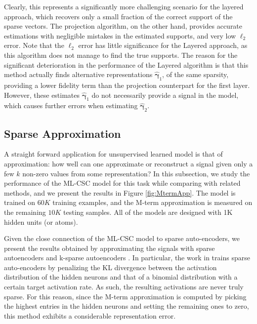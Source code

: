 \documentclass[10pt,journal]{IEEEtran}
\def\D{{\mathbf D}}
\def\gama{{\boldsymbol \gamma}}
\theoremstyle{plain}
\theoremstyle{definition}
\begin{document}
Clearly, this represents a significantly more challenging scenario for the layered approach, which recovers only a small fraction of the correct support of the sparse vectors. The projection algorithm, on the other hand, provides accurate estimations with negligible mistakes in the estimated supports, and very low $\ell_2$ error. Note that the $\ell_2$ error has little significance for the Layered approach, as this algorithm does not manage to find the true supports.
The reason for the significant deterioration in the performance of the Layered algorithm is that this method actually finds alternative representations $\hat{\gama}_1$, of the same sparsity, providing a lower fidelity term than the projection counterpart for the first layer. However, these estimates $\hat{\gama}_1$ do not necessarily provide a signal in the model, which causes further errors when estimating $\hat{\gama}_2$. 

\subsection{Sparse Approximation}

A straight forward application for unsupervised learned model is that of approximation: how well can one approximate or reconstruct a signal given only a few $k$ non-zero values from some representation? In this subsection, we study the performance of the ML-CSC model for this task while comparing with related methods, and we present the results in Figure \ref{fig:MtermApp}. The model is trained on $60K$ training examples, and the M-term approximation is measured on the remaining $10K$ testing samples. All of the models are designed with 1K hidden units (or atoms).

Given the close connection of the ML-CSC model to sparse auto-encoders, we present the results obtained by approximating the signals with sparse autoencoders \cite{ng2011sparse} and k-sparse autoencoders \cite{makhzani2013k}. In particular, the work in \cite{ng2011sparse} trains sparse auto-encoders by penalizing the KL divergence between the activation distribution of the hidden neurons and that of a binomial distribution with a certain target activation rate. As such, the resulting activations are never truly sparse. For this reason, since the M-term approximation is computed by picking the highest entries in the hidden neurons and setting the remaining ones to zero, this method exhibits a considerable representation error.
\end{document}
